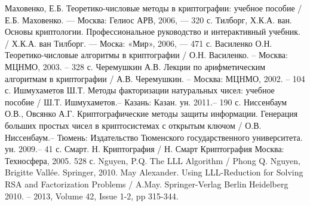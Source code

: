 
\newpage
{}
\begin{thebibliography}{}	
	  Маховенко, Е.Б. Теоретико-числовые методы в криптографии: учебное пособие / Е.Б. Маховенко. — Москва: Гелиос АРВ, 2006, — 320 с.
	  Тилборг, Х.К.А. ван. Основы криптологии. Профессиональное руководство и интерактивный учебник. / Х.К.А. ван Тилборг. — Моска: «Мир», 2006,
	  — 471 с.
	  Василенко О.Н. Теоретико-числовые алгоритмы в криптографии / О.Н. Василенко. – Москва: МЦНМО, 2003. – 328 с.
	  Черемушкин А.В. Лекции по арифметическим алгоритмам в криптографии / А.В. Черемушкин. – Москва: МЦНМО, 2002. – 104 с.
	  Ишмухаметов Ш.Т. Методы факторизации натуральных чисел: учебное пособие / Ш.Т. Ишмухаметов.– Казань: Казан. ун. 2011.– 190 с.
	  Ниссенбаум О.В., Овсянко А.Г. Криптографические методы защиты информации. Генерация больших простых чисел в криптосистемах с открытым ключом / О.В. Ниссенбаум.– Тюмень: Издательство Тюменского государственного университета. ун. 2009.– 41 с.
	  Смарт. Н. Криптография / Н. Смарт Криптография Москва: Техносфера, 2005. 528 с.
	  Nguyen, P.Q. The LLL Algorithm / Phong Q. Nguyen, Brigitte Vallée. Springer, 2010.
	  May Alexander. Using LLL-Reduction for Solving RSA and Factorization Problems / A.May. Springer-Verlag Berlin Heidelberg 2010. –
	  2013, Volume 42, Issue 1-2, pp 315-344.	
\end{thebibliography}